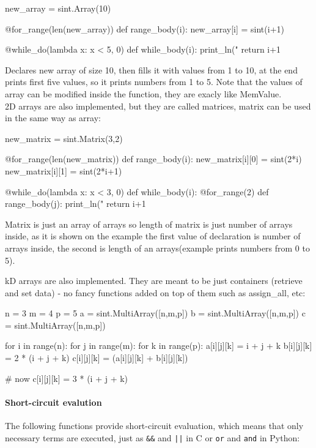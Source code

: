 \begin{mylisting}
\begin{mylisting}
new_array = sint.Array(10)

@for_range(len(new_array))
def range_body(i):
    new_array[i] = sint(i+1)

@while_do(lambda x: x < 5, 0)
def while_body(i):
    print_ln("%
    return i+1
\end{mylisting}
Declares new array of size 10, then fills it with values from 1 to 10, at the end prints first five values, so it prints numbers from 1 to 5. Note that the values of array can be modified inside the function, they are exacly like MemValue. \\
2D arrays are also implemented, but they are called matrices, matrix can be used in the same way as array:
\begin{mylisting}
new_matrix = sint.Matrix(3,2)

@for_range(len(new_matrix))
def range_body(i):
    new_matrix[i][0] = sint(2*i)
    new_matrix[i][1] = sint(2*i+1)

@while_do(lambda x: x < 3, 0)
def while_body(i):
    @for_range(2)
    def range_body(j):
        print_ln("%
    return i+1
\end{mylisting}
Matrix is just an array of arrays so length of matrix is just number of arrays inside, as it is shown on the example the first value of declaration is number of arrays inside, the second is length of an arrays(example prints numbers from 0 to 5).

kD arrays are also implemented. They are meant to be just containers (retrieve and set data) - no fancy functions added on top of them such as assign_all, etc:

\begin{mylisting}
n = 3
m = 4
p = 5
a = sint.MultiArray([n,m,p])
b = sint.MultiArray([n,m,p])
c = sint.MultiArray([n,m,p])

for i in range(n):
	for j in range(m):
		for k in range(p):
			a[i][j][k] = i + j + k
			b[i][j][k] = 2 * (i + j + k)
			c[i][j][k] = (a[i][j][k] + b[i][j][k])

# now c[i][j][k] = 3 * (i + j + k)
\end{mylisting}


\paragraph{Short-circuit evalution}
The following functions provide short-circuit evaluation, which means
that only necessary terms are executed, just as \verb+&&+ and
\verb+||+ in C or \verb+or+ and \verb+and+ in Python:


\end{mylisting}
